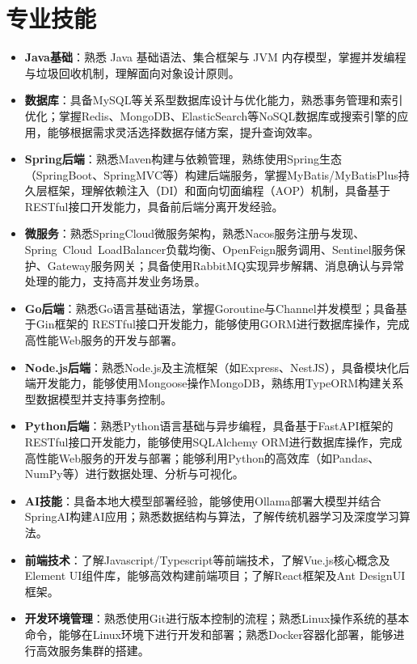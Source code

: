 \documentclass{resume}
\begin{document}
\section{专业技能}
\begin{normalsize}
  \begin{itemize}
    \item \textbf{Java基础}：熟悉 Java 基础语法、集合框架与 JVM 内存模型，掌握并发编程与垃圾回收机制，理解面向对象设计原则。
    \item \textbf{数据库}：具备MySQL等关系型数据库设计与优化能力，熟悉事务管理和索引优化；掌握Redis、MongoDB、ElasticSearch等NoSQL数据库或搜索引擎的应用，能够根据需求灵活选择数据存储方案，提升查询效率。
    \item \textbf{Spring后端}：熟悉Maven构建与依赖管理，熟练使用Spring生态（SpringBoot、SpringMVC等）构建后端服务，掌握MyBatis/MyBatisPlus持久层框架，理解依赖注入（DI）和面向切面编程（AOP）机制，具备基于RESTful接口开发能力，具备前后端分离开发经验。
    \item \textbf{微服务}：熟悉SpringCloud微服务架构，熟悉Nacos服务注册与发现、Spring Cloud LoadBalancer负载均衡、OpenFeign服务调用、Sentinel服务保护、Gateway服务网关；具备使用RabbitMQ实现异步解耦、消息确认与异常处理的能力，支持高并发业务场景。
    \item \textbf{Go后端}：熟悉Go语言基础语法，掌握Goroutine与Channel并发模型；具备基于Gin框架的 RESTful接口开发能力，能够使用GORM进行数据库操作，完成高性能Web服务的开发与部署。
    \item \textbf{Node.js后端}：熟悉Node.js及主流框架（如Express、NestJS），具备模块化后端开发能力，能够使用Mongoose操作MongoDB，熟练用TypeORM构建关系型数据模型并支持事务控制。
    \item \textbf{Python后端}：熟悉Python语言基础与异步编程，具备基于FastAPI框架的RESTful接口开发能力，能够使用SQLAlchemy ORM进行数据库操作，完成高性能Web服务的开发与部署；能够利用Python的高效库（如Pandas、NumPy等）进行数据处理、分析与可视化。
    \item \textbf{AI技能}：具备本地大模型部署经验，能够使用Ollama部署大模型并结合SpringAI构建AI应用；熟悉数据结构与算法，了解传统机器学习及深度学习算法。
    \item \textbf{前端技术}：了解Javascript/Typescript等前端技术，了解Vue.js核心概念及Element UI组件库，能够高效构建前端项目；了解React框架及Ant DesignUI框架。
    \item \textbf{开发环境管理}：熟悉使用Git进行版本控制的流程；熟悉Linux操作系统的基本命令，能够在Linux环境下进行开发和部署；熟悉Docker容器化部署，能够进行高效服务集群的搭建。
    
  \end{itemize}
\end{normalsize}
\end{document}

